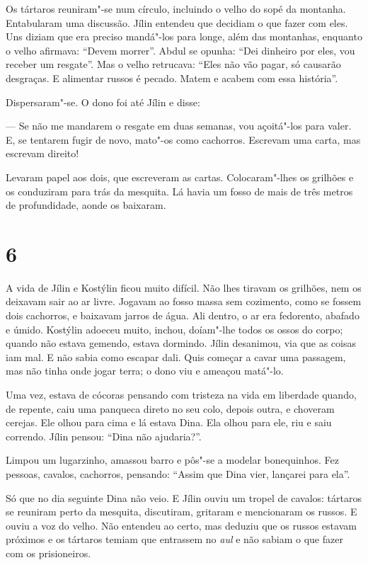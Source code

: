Os tártaros reuniram"-se num círculo, incluindo o velho do sopé da
montanha. Entabularam uma discussão. Jílin entendeu que decidiam o que
fazer com eles. Uns diziam que era preciso mandá"-los para longe, além
das montanhas, enquanto o velho afirmava: ``Devem morrer''. Abdul se
opunha: ``Dei dinheiro por eles, vou receber um resgate''. Mas o velho
retrucava: ``Eles não vão pagar, só causarão desgraças. E alimentar
russos é pecado. Matem e acabem com essa história''.

Dispersaram"-se. O dono foi até Jílin e disse:

--- Se não me mandarem o resgate em duas semanas, vou açoitá"-los para
valer. E, se tentarem fugir de novo, mato"-os como cachorros. Escrevam
uma carta, mas escrevam direito!

Levaram papel aos dois, que escreveram as cartas. Colocaram"-lhes os
grilhões e os conduziram para trás da mesquita. Lá havia um fosso de
mais de três metros de profundidade, aonde os baixaram.

\section{6}

A vida de Jílin e Kostýlin ficou muito difícil. Não lhes tiravam os
grilhões, nem os deixavam sair ao ar livre. Jogavam ao fosso massa sem
cozimento, como se fossem dois cachorros, e baixavam jarros de água. Ali
dentro, o ar era fedorento, abafado e úmido. Kostýlin adoeceu muito,
inchou, doíam"-lhe todos os ossos do corpo; quando não estava gemendo,
estava dormindo. Jílin desanimou, via que as coisas iam mal. E não sabia
como escapar dali. Quis começar a cavar uma passagem, mas não tinha onde
jogar terra; o dono viu e ameaçou matá"-lo.

Uma vez, estava de cócoras pensando com tristeza na vida em liberdade
quando, de repente, caiu uma panqueca direto no seu colo, depois outra,
e choveram cerejas. Ele olhou para cima e lá estava Dina. Ela olhou para
ele, riu e saiu correndo. Jílin pensou: ``Dina não ajudaria?''.

Limpou um lugarzinho, amassou barro e pôs"-se a modelar bonequinhos. Fez
pessoas, cavalos, cachorros, pensando: ``Assim que Dina vier, lançarei
para ela''.

Só que no dia seguinte Dina não veio. E Jílin ouviu um tropel de
cavalos: tártaros se reuniram perto da mesquita, discutiram, gritaram e
mencionaram os russos. E ouviu a voz do velho. Não entendeu ao certo,
mas deduziu que os russos estavam próximos e os tártaros temiam que
entrassem no \emph{aul} e não sabiam o que fazer com os prisioneiros.

